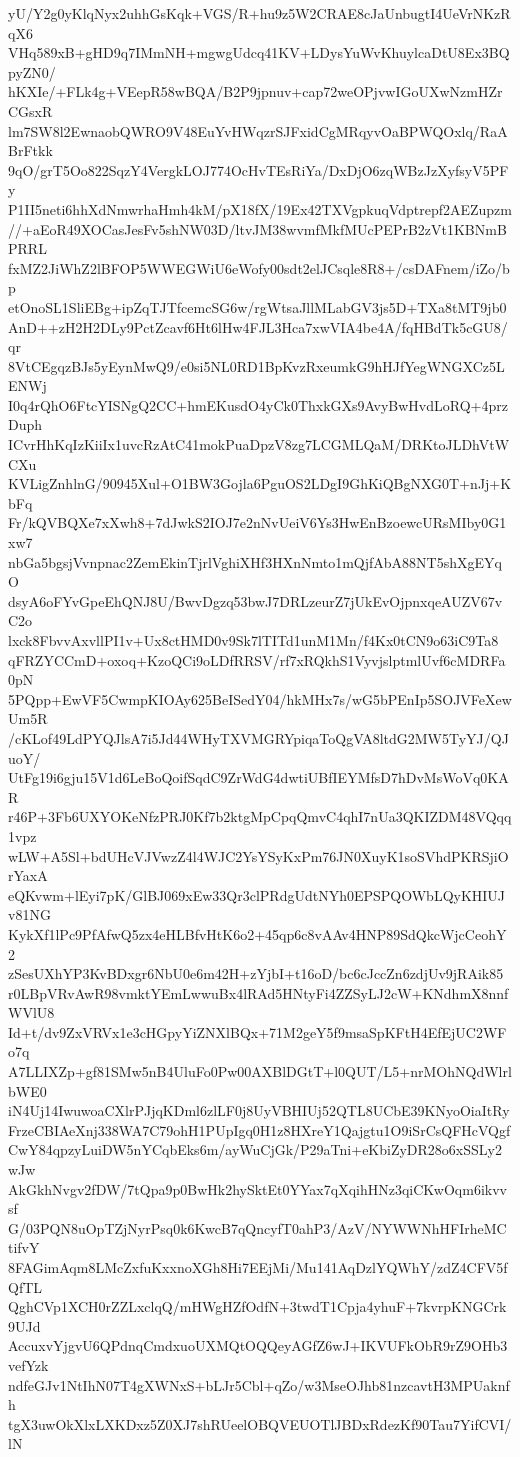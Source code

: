 yU/Y2g0yKlqNyx2uhhGsKqk+VGS/R+hu9z5W2CRAE8cJaUnbugtI4UeVrNKzRqX6
VHq589xB+gHD9q7IMmNH+mgwgUdcq41KV+LDysYuWvKhuylcaDtU8Ex3BQpyZN0/
hKXIe/+FLk4g+VEepR58wBQA/B2P9jpnuv+cap72weOPjvwIGoUXwNzmHZrCGsxR
lm7SW8l2EwnaobQWRO9V48EuYvHWqzrSJFxidCgMRqyvOaBPWQOxlq/RaABrFtkk
9qO/grT5Oo822SqzY4VergkLOJ774OcHvTEsRiYa/DxDjO6zqWBzJzXyfsyV5PFy
P1II5neti6hhXdNmwrhaHmh4kM/pX18fX/19Ex42TXVgpkuqVdptrepf2AEZupzm
//+aEoR49XOCasJesFv5shNW03D/ltvJM38wvmfMkfMUcPEPrB2zVt1KBNmBPRRL
fxMZ2JiWhZ2lBFOP5WWEGWiU6eWofy00sdt2elJCsqle8R8+/csDAFnem/iZo/bp
etOnoSL1SliEBg+ipZqTJTfcemcSG6w/rgWtsaJllMLabGV3js5D+TXa8tMT9jb0
AnD++zH2H2DLy9PctZcavf6Ht6lHw4FJL3Hca7xwVIA4be4A/fqHBdTk5cGU8/qr
8VtCEgqzBJs5yEynMwQ9/e0si5NL0RD1BpKvzRxeumkG9hHJfYegWNGXCz5LENWj
I0q4rQhO6FtcYISNgQ2CC+hmEKusdO4yCk0ThxkGXs9AvyBwHvdLoRQ+4przDuph
ICvrHhKqIzKiiIx1uvcRzAtC41mokPuaDpzV8zg7LCGMLQaM/DRKtoJLDhVtWCXu
KVLigZnhlnG/90945Xul+O1BW3Gojla6PguOS2LDgI9GhKiQBgNXG0T+nJj+KbFq
Fr/kQVBQXe7xXwh8+7dJwkS2IOJ7e2nNvUeiV6Ys3HwEnBzoewcURsMIby0G1xw7
nbGa5bgsjVvnpnac2ZemEkinTjrlVghiXHf3HXnNmto1mQjfAbA88NT5shXgEYqO
dsyA6oFYvGpeEhQNJ8U/BwvDgzq53bwJ7DRLzeurZ7jUkEvOjpnxqeAUZV67vC2o
lxck8FbvvAxvllPI1v+Ux8ctHMD0v9Sk7lTITd1unM1Mn/f4Kx0tCN9o63iC9Ta8
qFRZYCCmD+oxoq+KzoQCi9oLDfRRSV/rf7xRQkhS1VyvjslptmlUvf6cMDRFa0pN
5PQpp+EwVF5CwmpKIOAy625BeISedY04/hkMHx7s/wG5bPEnIp5SOJVFeXewUm5R
/cKLof49LdPYQJlsA7i5Jd44WHyTXVMGRYpiqaToQgVA8ltdG2MW5TyYJ/QJuoY/
UtFg19i6gju15V1d6LeBoQoifSqdC9ZrWdG4dwtiUBfIEYMfsD7hDvMsWoVq0KAR
r46P+3Fb6UXYOKeNfzPRJ0Kf7b2ktgMpCpqQmvC4qhI7nUa3QKIZDM48VQqq1vpz
wLW+A5Sl+bdUHcVJVwzZ4l4WJC2YsYSyKxPm76JN0XuyK1soSVhdPKRSjiOrYaxA
eQKvwm+lEyi7pK/GlBJ069xEw33Qr3clPRdgUdtNYh0EPSPQOWbLQyKHIUJv81NG
KykXf1lPc9PfAfwQ5zx4eHLBfvHtK6o2+45qp6c8vAAv4HNP89SdQkcWjcCeohY2
zSesUXhYP3KvBDxgr6NbU0e6m42H+zYjbI+t16oD/bc6cJccZn6zdjUv9jRAik85
r0LBpVRvAwR98vmktYEmLwwuBx4lRAd5HNtyFi4ZZSyLJ2cW+KNdhmX8nnfWVlU8
Id+t/dv9ZxVRVx1e3cHGpyYiZNXlBQx+71M2geY5f9msaSpKFtH4EfEjUC2WFo7q
A7LLIXZp+gf81SMw5nB4UluFo0Pw00AXBlDGtT+l0QUT/L5+nrMOhNQdWlrlbWE0
iN4Uj14IwuwoaCXlrPJjqKDml6zlLF0j8UyVBHIUj52QTL8UCbE39KNyoOiaItRy
FrzeCBIAeXnj338WA7C79ohH1PUpIgq0H1z8HXreY1Qajgtu1O9iSrCsQFHcVQgf
CwY84qpzyLuiDW5nYCqbEks6m/ayWuCjGk/P29aTni+eKbiZyDR28o6xSSLy2wJw
AkGkhNvgv2fDW/7tQpa9p0BwHk2hySktEt0YYax7qXqihHNz3qiCKwOqm6ikvvsf
G/03PQN8uOpTZjNyrPsq0k6KwcB7qQncyfT0ahP3/AzV/NYWWNhHFIrheMCtifvY
8FAGimAqm8LMcZxfuKxxnoXGh8Hi7EEjMi/Mu141AqDzlYQWhY/zdZ4CFV5fQfTL
QghCVp1XCH0rZZLxclqQ/mHWgHZfOdfN+3twdT1Cpja4yhuF+7kvrpKNGCrk9UJd
AccuxvYjgvU6QPdnqCmdxuoUXMQtOQQeyAGfZ6wJ+IKVUFkObR9rZ9OHb3vefYzk
ndfeGJv1NtIhN07T4gXWNxS+bLJr5Cbl+qZo/w3MseOJhb81nzcavtH3MPUaknfh
tgX3uwOkXlxLXKDxz5Z0XJ7shRUeelOBQVEUOTlJBDxRdezKf90Tau7YifCVI/lN

